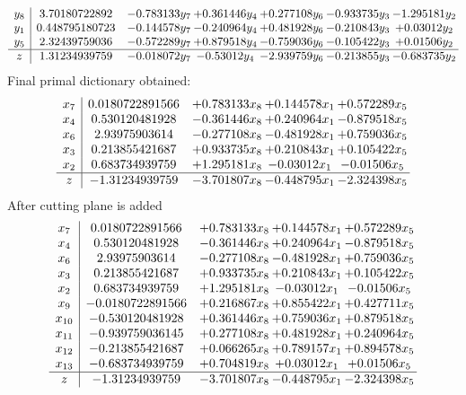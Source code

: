 \documentclass[11pt]{article}
\begin{document}
\[\begin{array}{c| c c@{\hskip 2pt} c@{\hskip 2pt} c@{\hskip 2pt} c@{\hskip 2pt} c@{\hskip 2pt} }
 y_{8}   &  3.70180722892 & -0.783133 y_{7} & + 0.361446 y_{4} & + 0.277108 y_{6} & -0.933735 y_{3} & -1.295181 y_{2}\\
 y_{1}   &  0.448795180723 & -0.144578 y_{7} & -0.240964 y_{4} & + 0.481928 y_{6} & -0.210843 y_{3} & + 0.03012 y_{2}\\
 y_{5}   &  2.32439759036 & -0.572289 y_{7} & + 0.879518 y_{4} & -0.759036 y_{6} & -0.105422 y_{3} & + 0.01506 y_{2}\\
\hline
z    &  1.31234939759 & -0.018072 y_{7} & -0.53012 y_{4} & -2.939759 y_{6} & -0.213855 y_{3} & -0.683735 y_{2}\\
\end{array}\]
 Final primal dictionary obtained: 
\[\begin{array}{c| c c@{\hskip 2pt} c@{\hskip 2pt} c@{\hskip 2pt} }
 x_{7}   &  0.0180722891566 & + 0.783133 x_{8} & + 0.144578 x_{1} & + 0.572289 x_{5}\\
 x_{4}   &  0.530120481928 & -0.361446 x_{8} & + 0.240964 x_{1} & -0.879518 x_{5}\\
 x_{6}   &  2.93975903614 & -0.277108 x_{8} & -0.481928 x_{1} & + 0.759036 x_{5}\\
 x_{3}   &  0.213855421687 & + 0.933735 x_{8} & + 0.210843 x_{1} & + 0.105422 x_{5}\\
 x_{2}   &  0.683734939759 & + 1.295181 x_{8} & -0.03012 x_{1} & -0.01506 x_{5}\\
\hline
z    &  -1.31234939759 & -3.701807 x_{8} & -0.448795 x_{1} & -2.324398 x_{5}\\
\end{array}\]
 After cutting plane is added 
\[\begin{array}{c| c c@{\hskip 2pt} c@{\hskip 2pt} c@{\hskip 2pt} }
 x_{7}   &  0.0180722891566 & + 0.783133 x_{8} & + 0.144578 x_{1} & + 0.572289 x_{5}\\
 x_{4}   &  0.530120481928 & -0.361446 x_{8} & + 0.240964 x_{1} & -0.879518 x_{5}\\
 x_{6}   &  2.93975903614 & -0.277108 x_{8} & -0.481928 x_{1} & + 0.759036 x_{5}\\
 x_{3}   &  0.213855421687 & + 0.933735 x_{8} & + 0.210843 x_{1} & + 0.105422 x_{5}\\
 x_{2}   &  0.683734939759 & + 1.295181 x_{8} & -0.03012 x_{1} & -0.01506 x_{5}\\
 x_{9}   &  -0.0180722891566 & + 0.216867 x_{8} & + 0.855422 x_{1} & + 0.427711 x_{5}\\
 x_{10}   &  -0.530120481928 & + 0.361446 x_{8} & + 0.759036 x_{1} & + 0.879518 x_{5}\\
 x_{11}   &  -0.939759036145 & + 0.277108 x_{8} & + 0.481928 x_{1} & + 0.240964 x_{5}\\
 x_{12}   &  -0.213855421687 & + 0.066265 x_{8} & + 0.789157 x_{1} & + 0.894578 x_{5}\\
 x_{13}   &  -0.683734939759 & + 0.704819 x_{8} & + 0.03012 x_{1} & + 0.01506 x_{5}\\
\hline
z    &  -1.31234939759 & -3.701807 x_{8} & -0.448795 x_{1} & -2.324398 x_{5}\\
\end{array}\]
\end{document}
